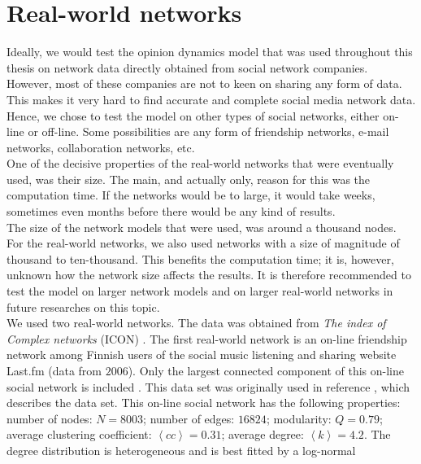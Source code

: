 \documentclass[11 pt , letterpaper , twoside , openright]{book}
\begin{document}
\section{Real-world networks}\label{realnetwork}

Ideally, we would test the opinion dynamics model that was used throughout this thesis on network data directly obtained from social network companies. However, most of these companies are not to keen on sharing any form of data. This makes it very hard to find accurate and complete social media network data. Hence, we chose to test the model on other types of social networks, either on-line or off-line. Some possibilities are any form of friendship networks, e-mail networks, collaboration networks, etc. \\
\newline
One of the decisive properties of the real-world networks that were eventually used, was their size. The main, and actually only, reason for this was the computation time. If the networks would be to large, it would take weeks, sometimes even months before there would be any kind of results.\\
\newline
The size of the network models that were used, was around a thousand nodes. For the real-world networks, we also used networks with a size of magnitude of thousand to ten-thousand. This benefits the computation time; it is, however, unknown how the network size affects the results. It is therefore recommended to test the model on larger network models and on larger real-world networks in future researches on this topic. \\
\newline
We used two real-world networks. The data was obtained from \textit{The index of Complex networks} (ICON) \cite{ICON}. The first real-world network is an on-line friendship network among Finnish users of the social music listening and sharing website Last.fm (data from $2006$). Only the largest connected component of this on-line social network is included \cite{ICON}. This data set was originally used in reference \cite{Toivonen2009}, which describes the data set. This on-line social network has the following properties: number of nodes: $N = 8003$; number of edges: $16824$; modularity: $Q = 0.79$; average clustering coefficient: $\left<cc\right> = 0.31$; average degree: $\left<k\right> = 4.2$. The degree distribution is heterogeneous and is best fitted by a log-normal
\end{document}
